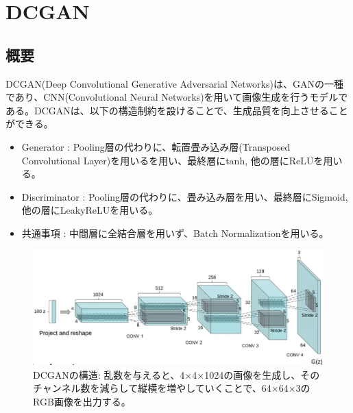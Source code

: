 \documentclass{ltjsarticle}
\begin{document}
\clearpage
\section{DCGAN}
\subsection{概要}
DCGAN(Deep Convolutional Generative Adversarial Networks)は、GANの一種であり、CNN(Convolutional Neural Networks)を用いて画像生成を行うモデルである。DCGANは、以下の構造制約を設けることで、生成品質を向上させることができる。
\begin{itemize}
  \item Generator : Pooling層の代わりに、転置畳み込み層(Transposed Convolutional Layer)を用いるを用い、最終層にtanh, 他の層にReLUを用いる。
  \item Discriminator : Pooling層の代わりに、畳み込み層を用い、最終層にSigmoid, 他の層にLeakyReLUを用いる。
  \item 共通事項 : 中間層に全結合層を用いず、Batch Normalizationを用いる。
\end{itemize}

\begin{figure}[htbp]
  \centering
  \includegraphics[width=13cm]{./capture/DCGAN.png}
  \caption{DCGANの構造: 乱数を与えると、4×4×1024の画像を生成し、そのチャンネル数を減らして縦横を増やしていくことで、64×64×3のRGB画像を出力する。}
  \label{fig:DCGAN}
\end{figure}
\end{document}
